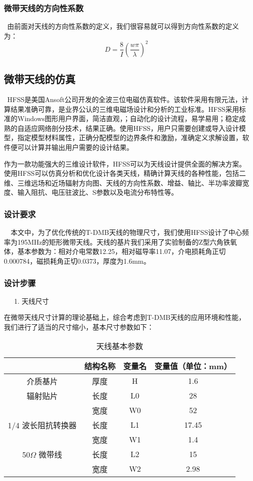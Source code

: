 \documentclass{article}
\begin{document}
\subsubsection{微带天线的方向性系数}

\
由前面对天线的方向性系数的定义，我们很容易就可以得到方向性系数的定义为：
\[ D = \frac{8}{I} \left( \frac{w \pi}{\lambda} \right)^2 \]


\subsection{微带天线的仿真}

\
HFSS是美国Ansoft公司开发的全波三位电磁仿真软件。该软件采用有限元法，计算结果准确可靠，是业界公认的三维电磁场设计和分析的工业标准。HFSS采用标准的Windows图形用户界面，简洁直观，；自动化的设计流程，易学易用；稳定成熟的自适应网络剖分技术，结果正确。使用HFSS，用户只需要创建或导入设计模型，指定模型材料属性，正确分配模型的边界条件和激励，准确定义求解设置，软件便可以计算并输出用户需要的设计结果。

作为一款功能强大的三维设计软件，HFSS可以为天线设计提供全面的解决方案。使用HFSS可以仿真分析和优化设计各类天线，精确计算天线的各种性能，包括二维、三维远场和近场辐射方向图、天线的方向性系数、增益、轴比、半功率波瓣宽度、输入阻抗、电压驻波比、S参数以及电流分布特性等。

\subsubsection{设计要求}

\ \
本文中，为了优化传统的T-DMB天线的物理尺寸，我们使用HFSS设计了中心频率为195MHz的矩形微带天线。天线的基片我们采用了实验制备的Z型六角铁氧体，基本参数为：相对介电常数12.25，相对磁导率11.07，介电损耗角正切0.000784，磁损耗角正切0.0373，厚度为1.6mm。

\subsubsection{设计步骤}

\ \ \ 1. 天线尺寸

在微带天线尺寸计算的理论基础上，综合考虑到T-DMB天线的应用环境和性能，我们进行了适当的尺寸缩小，基本尺寸参数如下：

\begin{table}[h]
  \begin{tabular}{|c|c|c|c|}
    \hline
    & 结构名称 & 变量名 & 变量值（单位：mm）\\
    \hline
    介质基片 & 厚度 & H & 1.6\\
    \hline
    辐射贴片 & 长度 & L0 & 28\\
    \hline
    & 宽度 & W0 & 52\\
    \hline
    1/4 波长阻抗转换器 & 长度 & L1 & 17.45\\
    \hline
    & 宽度 & W1 & 1.4\\
    \hline
    50$\Omega$ 微带线 & 长度 & L2 & 15\\
    \hline
    & 宽度 & W2 & 2.98\\
    \hline
  \end{tabular}
  \caption{天线基本参数}
\end{table}
\end{document}
